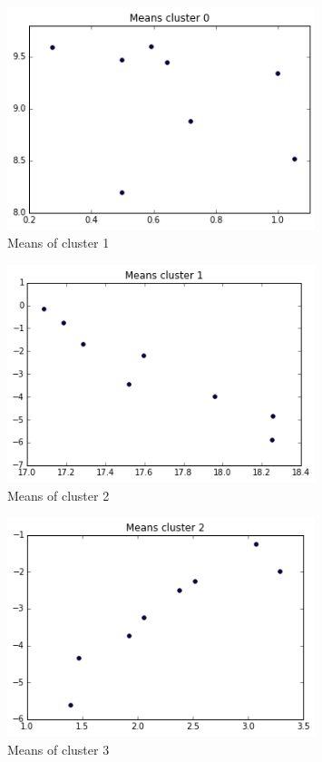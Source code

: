 \documentclass[paper=a4, fontsize=11pt]{scrartcl} %
\numberwithin{equation}{section} %
\numberwithin{figure}{section} %
\numberwithin{table}{section} %
\begin{document}
\begin{figure}[ht]
	\centering
  \includegraphics[width=0.8\textwidth]{mean_c1.png}
	\caption{Means of cluster 1}
	\label{figvn6}
\end{figure}
\begin{figure}[ht]
	\centering
  \includegraphics[width=0.8\textwidth]{mean_c2.png}
	\caption{Means of cluster 2}
	\label{figvn6}
\end{figure}
\begin{figure}[ht]
	\centering
  \includegraphics[width=0.8\textwidth]{mean_c3.png}
	\caption{Means of cluster 3}
	\label{figvn6}
\end{figure}
\end{document}
